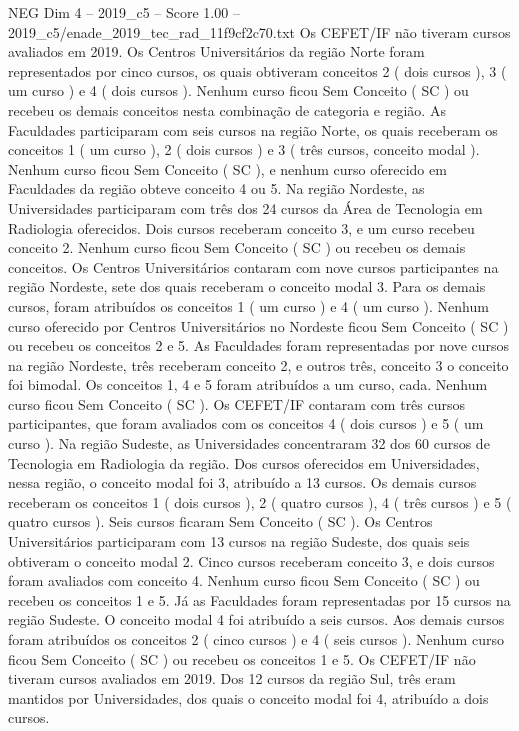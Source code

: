 \begin{textsample}{NEG Dim 4 – 2019\_c5 – Score 1.00 – 2019\_c5/enade\_2019\_tec\_rad\_11f9cf2c70.txt}
Os CEFET/IF não tiveram cursos avaliados em 2019.
Os Centros Universitários da região Norte foram representados por cinco cursos, os quais obtiveram conceitos 2 ( dois cursos ), 3 ( um curso ) e 4 ( dois cursos ).
Nenhum curso ficou Sem Conceito ( SC ) ou recebeu os demais conceitos nesta combinação de categoria e região.
As Faculdades participaram com seis cursos na região Norte, os quais receberam os conceitos 1 ( um curso ), 2 ( dois cursos ) e 3 ( três cursos, conceito modal ).
Nenhum curso ficou Sem Conceito ( SC ), e nenhum curso oferecido em Faculdades da região obteve conceito 4 ou 5.
Na região Nordeste, as Universidades participaram com três dos 24 cursos da Área de Tecnologia em Radiologia oferecidos.
Dois cursos receberam conceito 3, e um curso recebeu conceito 2.
Nenhum curso ficou Sem Conceito ( SC ) ou recebeu os demais conceitos.
Os Centros Universitários contaram com nove cursos participantes na região Nordeste, sete dos quais receberam o conceito modal 3.
Para os demais cursos, foram atribuídos os conceitos 1 ( um curso ) e 4 ( um curso ).
Nenhum curso oferecido por Centros Universitários no Nordeste ficou Sem Conceito ( SC ) ou recebeu os conceitos 2 e 5.
As Faculdades foram representadas por nove cursos na região Nordeste, três receberam conceito 2, e outros três, conceito 3 o conceito foi bimodal.
Os conceitos 1, 4 e 5 foram atribuídos a um curso, cada.
Nenhum curso ficou Sem Conceito ( SC ).
Os CEFET/IF contaram com três cursos participantes, que foram avaliados com os conceitos 4 ( dois cursos ) e 5 ( um curso ).
Na região Sudeste, as Universidades concentraram 32 dos 60 cursos de Tecnologia em Radiologia da região.
Dos cursos oferecidos em Universidades, nessa região, o conceito modal foi 3, atribuído a 13 cursos.
Os demais cursos receberam os conceitos 1 ( dois cursos ), 2 ( quatro cursos ), 4 ( três cursos ) e 5 ( quatro cursos ).
Seis cursos ficaram Sem Conceito ( SC ).
Os Centros Universitários participaram com 13 cursos na região Sudeste, dos quais seis obtiveram o conceito modal 2.
Cinco cursos receberam conceito 3, e dois cursos foram avaliados com conceito 4.
Nenhum curso ficou Sem Conceito ( SC ) ou recebeu os conceitos 1 e 5.
Já as Faculdades foram representadas por 15 cursos na região Sudeste.
O conceito modal 4 foi atribuído a seis cursos.
Aos demais cursos foram atribuídos os conceitos 2 ( cinco cursos ) e 4 ( seis cursos ).
Nenhum curso ficou Sem Conceito ( SC ) ou recebeu os conceitos 1 e 5.
Os CEFET/IF não tiveram cursos avaliados em 2019.
Dos 12 cursos da região Sul, três eram mantidos por Universidades, dos quais o conceito modal foi 4, atribuído a dois cursos.

\end{textsample}

